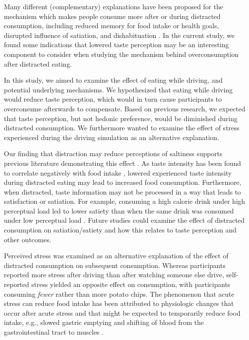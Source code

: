 \documentclass[authordate, empirical, issue]{jote-new-article}
\begin{document}
Many different (complementary) explanations have been proposed for the mechanism which makes people consume more after or during distracted consumption, including reduced memory for food intake or health goals, disrupted influence of satiation, and dishabituation \parencites{Forde2018}{Robinson2013}. In the current study, we found some indications that lowered taste perception may be an interesting component to consider when studying the mechanism behind overconsumption after distracted eating.

\begin{originalPurpose}
  In this study, we aimed to examine the effect of eating while driving, and potential underlying mechanisms. We hypothesized that eating while driving would reduce taste perception, which would in turn cause participants to overconsume afterwards to compensate. Based on previous research, we expected that taste perception, but not hedonic preference, would be diminished during distracted consumption. We furthermore wanted to examine the effect of stress experienced during the driving simulation as an alternative explanation.
\end{originalPurpose}


Our finding that distraction may reduce perceptions of saltiness supports previous literature demonstrating this effect \parencites{Wal2013}{Liang2018}{Duif2020}. As taste intensity has been found to correlate negatively with food intake \parencites{Forde2013}, lowered experienced taste intensity during distracted eating may lead to increased food consumption. Furthermore, when distracted, taste information may not be processed in a way that leads to satisfaction or satiation. For example, consuming a high calorie drink under high perceptual load led to lower satiety than when the same drink was consumed under low perceptual load \parencites{Morris2020}. Future studies could examine the effect of distracted consumption on satiation/satiety and how this relates to taste perception and other outcomes.



Perceived stress was examined as an alternative explanation of the effect of distracted consumption on subsequent consumption. Whereas participants reported more stress after driving than after watching someone else drive, self-reported stress yielded an opposite effect on consumption, with participants consuming \emph{fewer} rather than more potato chips. The phenomenon that acute stress can reduce food intake has been attributed to physiologic changes that occur after acute stress and that might be expected to temporarily reduce food intake, e.g., slowed gastric emptying and shifting of blood from the gastrointestinal tract to muscles \parencites{Torres2007}.
\end{document}
